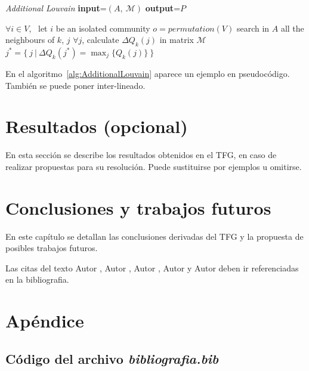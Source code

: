\documentclass[twoside]{urjc-tfg}
\begin{document}
\begin{algorithm}[t]
  \caption{\textit{Additional Louvain} \textbf{input}=$\left(A, \ \mathcal{M}\right)$ \textbf{output}=$P$}
  \begin{algorithmic}[1]
    \STATE $\forall i \in V$, \ let $i$ be an isolated community
    \STATE $o=permutation(V)$
    \STATE search in $A$ all the neighbours of $k$, $j$
    \STATE $\forall j$, calculate $\Delta Q_k(j)$ in matrix $\mathcal{M}$
    \STATE $j^*=\{ \ j \ | \ \Delta Q_k(j^*)=\max_j\{Q_k(j)\} \ \}$
    \ELSE
    \ENDIF
    \ENDFOR
  \end{algorithmic}
  \label{alg:AdditionalLouvain}
\end{algorithm}


En el algoritmo~\ref{alg:AdditionalLouvain} aparece un ejemplo en
pseudocódigo.  También se puede poner  inter-lineado.


\chapter{Resultados (opcional)}
\label{sec:resulObtenidos}


En esta sección se describe los resultados obtenidos en el TFG, en
caso de realizar propuestas para su resolución. Puede sustituirse por
ejemplos u omitirse.


\chapter{Conclusiones y trabajos futuros}

En este capítulo se detallan las conclusiones derivadas del TFG y la
propuesta de posibles trabajos futuros.

Las citas del texto Autor \cite{giaquinta}, Autor \cite{fortune},
Autor \cite{fortuneB}, Autor \cite{mitchell} y Autor \cite{morrey}
deben ir referenciadas en la bibliografia.



\cleardoublepage
{}
{}

\printbibliography


\cleardoublepage
\appendix

\chapter{Apéndice}


\section{Código del archivo \emph{bibliografia.bib}}
\label{app:bib}


\end{document}
